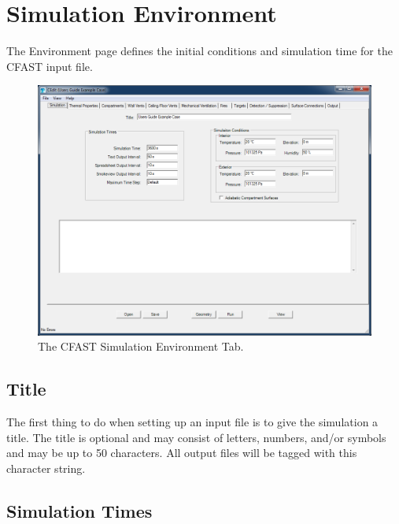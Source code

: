\chapter{Simulation Environment}

The Environment page defines the initial conditions and simulation time for the CFAST input file.

\begin{figure}[ht]
\centering
\includegraphics[width=6.5in]{FIGURES/Environment_Tab}
\caption[The CFAST Simulation Environment Tab]{The CFAST Simulation Environment Tab.}
\end{figure}

\section{Title}

The first thing to do when setting up an input file is to give the simulation a title. The title is optional and may consist of letters, numbers, and/or symbols and may be up to 50 characters. All output files will be tagged with this character string.


\section{Simulation Times}

